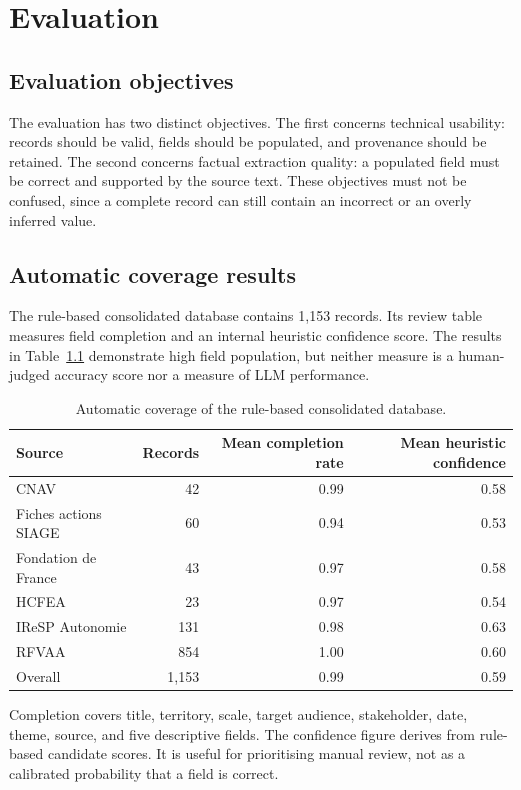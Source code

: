 \documentclass[
11pt,
english,
singlespacing,
headsepline,
]{MastersDoctoralThesis}
\begin{document}
\chapter{Evaluation}

\section{Evaluation objectives}

The evaluation has two distinct objectives. The first concerns technical
usability: records should be valid, fields should be populated, and provenance
should be retained. The second concerns factual extraction quality: a populated
field must be correct and supported by the source text. These objectives must
not be confused, since a complete record can still contain an incorrect or an
overly inferred value.

\section{Automatic coverage results}

The rule-based consolidated database contains 1,153 records. Its review table
measures field completion and an internal heuristic confidence score. The
results in Table~\ref{tab:coverage-results} demonstrate high field population,
but neither measure is a human-judged accuracy score nor a measure of LLM
performance.

\begin{table}[H]
\centering
\begin{tabular}{lrrr}
\toprule
Source & Records & Mean completion rate & Mean heuristic confidence \\
\midrule
CNAV & 42 & 0.99 & 0.58 \\
Fiches actions SIAGE & 60 & 0.94 & 0.53 \\
Fondation de France & 43 & 0.97 & 0.58 \\
HCFEA & 23 & 0.97 & 0.54 \\
IReSP Autonomie & 131 & 0.98 & 0.63 \\
RFVAA & 854 & 1.00 & 0.60 \\
\midrule
Overall & 1,153 & 0.99 & 0.59 \\
\bottomrule
\end{tabular}
\caption{Automatic coverage of the rule-based consolidated database.}
\label{tab:coverage-results}
\end{table}

Completion covers title, territory, scale, target audience, stakeholder, date,
theme, source, and five descriptive fields. The confidence figure derives from
rule-based candidate scores. It is useful for prioritising manual review, not as
a calibrated probability that a field is correct.
\end{document}
